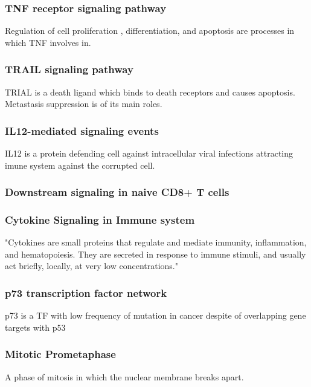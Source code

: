 \documentclass[3p,authoryear,preprint,12pt]{elsarticle}
\begin{document}
\subsubsection{TNF receptor signaling pathway}
Regulation of cell proliferation , differentiation, and apoptosis are processes in which TNF involves in. %

\subsubsection{TRAIL signaling pathway}
TRIAL is a death ligand which binds to death receptors and causes apoptosis. Metastasis suppression is of its main roles. %

\subsubsection{IL12-mediated signaling events}
IL12 is a protein defending cell against intracellular viral infections attracting imune system against the corrupted cell. %

\subsubsection{Downstream signaling in naive CD8+ T cells}

\subsubsection{Cytokine Signaling in Immune system}
"Cytokines are small proteins that regulate and mediate immunity, inflammation, and hematopoiesis. They are secreted in response to immune stimuli, and usually act briefly, locally, at very low concentrations." %

\subsubsection{p73 transcription factor network}
p73 is a TF with low frequency of mutation in cancer despite of overlapping gene targets with p53 %

\subsubsection{Mitotic Prometaphase}
A phase of mitosis in which the nuclear membrane breaks apart.
\end{document}
